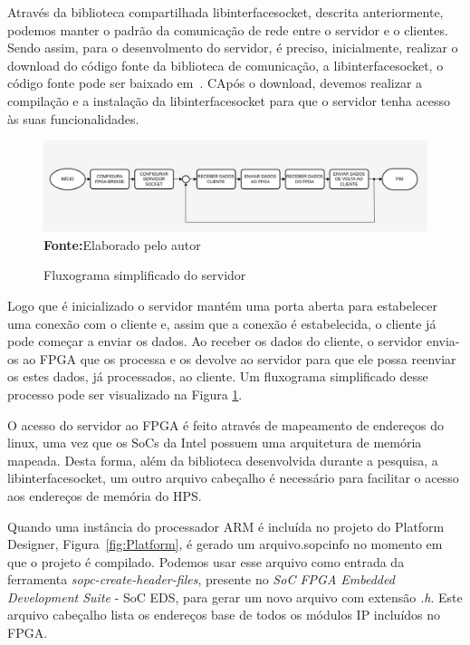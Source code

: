 Através da biblioteca compartilhada libinterfacesocket, descrita anteriormente, podemos manter o padrão da comunicação de rede entre o servidor e o clientes. Sendo assim, para o desenvolmento do servidor, é preciso, inicialmente, realizar o download do código fonte da biblioteca de comunicação, a libinterfacesocket, o código fonte pode ser baixado em~\cite{interface-socket-server}. CApós o download, devemos realizar a compilação e a instalação da libinterfacesocket para que o servidor tenha acesso às suas funcionalidades. 

\begin{figure}[ht]
	\caption{Fluxograma simplificado do servidor}
	\begin{center}
		\includegraphics[scale=0.41]{imagens/fluxogramaServidor.png}\\
		{\small \textbf{Fonte:}Elaborado pelo autor}
    \end{center}\label{fig:fluxoServidor}
\end{figure} 

Logo que é inicializado o servidor mantém uma porta aberta para estabelecer uma conexão com o cliente e, assim que a conexão é estabelecida, o cliente já pode começar a enviar os dados. Ao receber os dados do cliente, o servidor envia-os ao FPGA que os processa e os devolve ao servidor para que ele possa reenviar os estes dados, já processados, ao cliente. Um fluxograma simplificado desse processo pode ser visualizado na Figura \ref{fig:fluxoServidor}.

O acesso do servidor ao FPGA é feito através de mapeamento de endereços do linux, uma vez que os SoCs da Intel possuem uma arquitetura de memória mapeada. Desta forma, além da biblioteca desenvolvida durante a pesquisa, a libinterfacesocket, um outro arquivo cabeçalho é necessário para facilitar o acesso aos endereços de memória do HPS\@. 

Quando uma instância do processador ARM é incluída no projeto do Platform Designer, Figura~\ref{fig:Platform}, é gerado um arquivo.sopcinfo no momento em que o projeto é compilado. Podemos usar esse arquivo como entrada da ferramenta \textit{sopc-create-header-files}, presente no \textit{SoC FPGA Embedded Development Suite} - SoC EDS, para gerar um novo arquivo com extensão \textit{.h}. Este arquivo cabeçalho lista os endereços base de todos os módulos IP incluídos no FPGA\@. 

